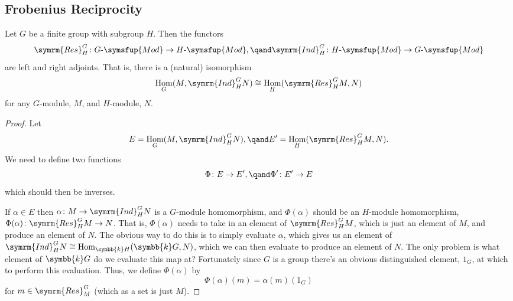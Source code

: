 \documentclass[fleqn]{NotesClass}
\makeatletter
\renewcommand{\field}{\symbb{k}}
\DeclareMathOperator{\Hom}{Hom}
\newcommand{\c@egory}[1]{\symsfup{#1}}
\newcommand{\Mod}[1]{#1\text{-}\c@egory{Mod}}
\newcommand{\isomorphic}{\cong}
\newcommand{\Res}{\symrm{Res}}
\newcommand{\Ind}{\symrm{Ind}}
\makeatother
\begin{document}
    \subsection{Frobenius Reciprocity}
    \begin{thm}{}{}
        Let \(G\) be a finite group with subgroup \(H\).
        Then the functors
        \begin{equation}
            \Res^G_H \colon \Mod{G} \to \Mod{H}, \qand \Ind^G_H \colon \Mod{H} \to \Mod{G}
        \end{equation}
        are left and right adjoints.
        That is, there is a (natural) isomorphism
        \begin{equation}
            \Hom_G(M, \Ind^G_H N) \isomorphic \Hom_H(\Res^G_H M, N)
        \end{equation}
        for any \(G\)-module, \(M\), and \(H\)-module, \(N\).
        \begin{proof}
            Let
            \begin{equation}
                E = \Hom_G(M, \Ind^G_H N), \qand E' = \Hom_H(\Res^G_H M, N).
            \end{equation}
            We need to define two functions
            \begin{equation}
                \Phi \colon E \to E', \qand \Phi' \colon E' \to E
            \end{equation}
            which should then be inverses.
            
            If \(\alpha \in E\) then \(\alpha \colon M \to \Ind^G_H N\) is a \(G\)-module homomorphism, and \(\Phi(\alpha)\) should be an \(H\)-module homomorphism, \(\Phi(\alpha) \colon \Res^G_H M \to N\).
            That is, \(\Phi(\alpha)\) needs to take in an element of \(\Res^G_H M\), which is just an element of \(M\), and produce an element of \(N\).
            The obvious way to do this is to simply evaluate \(\alpha\), which gives us an element of \(\Ind^G_H N \isomorphic \Hom_{\field H}(\field G, N)\), which we can then evaluate to produce an element of \(N\).
            The only problem is what element of \(\field G\) do we evaluate this map at?
            Fortunately since \(G\) is a group there's an obvious distinguished element, \(1_G\), at which to perform this evaluation.
            Thus, we define \(\Phi(\alpha)\) by
            \begin{equation}
                \Phi(\alpha)(m) = \alpha(m)(1_G)
            \end{equation}
            for \(m \in \Res^G_M\) (which as a set is just \(M\)).
            

\end{proof}
\end{thm}
\end{document}
